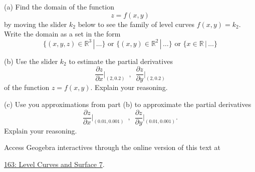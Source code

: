 \documentclass{ximera}
\begin{document}
\begin{question}  \label{E45hh6f45}
(a) Find the domain of the function
\[
   z = f(x,y) 
\]
by moving the slider $k_2$ below to see the family of level curves $f(x,y)=k_2$. Write the domain as a set in the form
\[
   \{  (x,y,z) \in \mathbb{R}^3 \, | \, \ldots    \} \text{ or } \{  (x,y) \in \mathbb{R}^2 \, | \, \ldots    \} \text{ or } \{  x \in \mathbb{R} \, | \, \ldots    \}
\]


(b) Use the slider $k_2$ to estimate the partial derivatives
\[
    \frac{\partial z}{\partial x}\Big|_{(2,0.2)} \,\,\, , \,\,\,   \frac{\partial z}{\partial y}\Big|_{(2,0.2)}
\]
of the function $z=f(x,y)$. Explain your reasoning.

(c) Use you approximations from part (b) to approximate the partial derivatives
\[
    \frac{\partial z}{\partial x}\Big|_{(0.01,0.001)} \,\,\, , \,\,\,   \frac{\partial z}{\partial y}\Big|_{(0.01,0.001)} .
\]
Explain your reasoning.

 
\begin{onlineOnly}
    \begin{center}
\end{center}
\end{onlineOnly}

Access Geogebra interactives through the online version of this text at
 
\href{https://www.geogebra.org/classic/ehscekb6}{163: Level Curves and Surface 7}.
\end{question}
\end{document}
